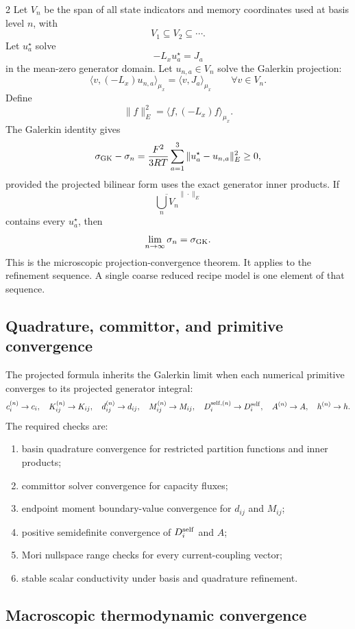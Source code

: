 \documentclass[10pt]{article}
\begin{document}
\begin{multicols}{2}
Let \(V_n\) be the span of all state indicators and memory coordinates used at
basis level \(n\), with
\[
V_1\subseteq V_2\subseteq\cdots.
\]
Let \(u_a^\star\) solve
\[
-L_xu_a^\star=J_a
\]
in the mean-zero generator domain. Let \(u_{n,a}\in V_n\) solve the Galerkin
projection:
\[
\langle v,(-L_x)u_{n,a}\rangle_{\mu_x}
=
\langle v,J_a\rangle_{\mu_x}
\qquad
\forall v\in V_n.
\]
Define
\[
\|f\|_E^2=\langle f,(-L_x)f\rangle_{\mu_x}.
\]
The Galerkin identity gives
\[
\sigma_{\rm GK}-\sigma_n
=
\frac{F^2}{3RT}
\sum_{a=1}^3
\|u_a^\star-u_{n,a}\|_E^2
\ge0,
\]
provided the projected bilinear form uses the exact generator inner products.
If
\[
\overline{\bigcup_n V_n}^{\|\cdot\|_E}
\]
contains every \(u_a^\star\), then
\[
\lim_{n\to\infty}\sigma_n=\sigma_{\rm GK}.
\]
This is the microscopic projection-convergence theorem. It applies to the
refinement sequence. A single coarse reduced recipe model is one element of
that sequence.

\subsection{Quadrature, committor, and primitive convergence}

The projected formula inherits the Galerkin limit when each numerical primitive
converges to its projected generator integral:
\[
c_i^{(n)}\to c_i,\quad
K_{ij}^{(n)}\to K_{ij},\quad
d_{ij}^{(n)}\to d_{ij},\quad
M_{ij}^{(n)}\to M_{ij},\quad
D_i^{{\rm self},(n)}\to D_i^{\rm self},\quad
A^{(n)}\to A,\quad
h^{(n)}\to h.
\]
The required checks are:
\begin{enumerate}
\item basin quadrature convergence for restricted partition functions and
inner products;
\item committor solver convergence for capacity fluxes;
\item endpoint moment boundary-value convergence for \(d_{ij}\) and \(M_{ij}\);
\item positive semidefinite convergence of \(D_i^{\rm self}\) and \(A\);
\item Mori nullspace range checks for every current-coupling vector;
\item stable scalar conductivity under basis and quadrature refinement.
\end{enumerate}

\subsection{Macroscopic thermodynamic convergence}


\end{multicols}
\end{document}
